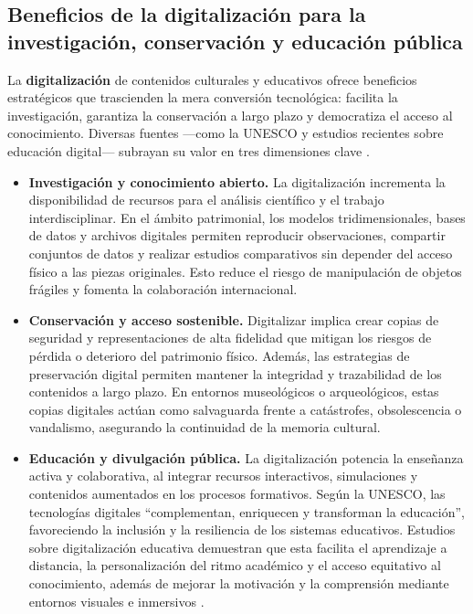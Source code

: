 \subsection*{Beneficios de la digitalización para la investigación, conservación y educación pública}

La \textbf{digitalización} de contenidos culturales y educativos ofrece beneficios estratégicos que trascienden la mera conversión tecnológica: facilita la investigación, garantiza la conservación a largo plazo y democratiza el acceso al conocimiento. Diversas fuentes —como la UNESCO y estudios recientes sobre educación digital— subrayan su valor en tres dimensiones clave \cite{TICPymes2024,UNESCODigitalEducation2025}.

\begin{itemize}
  \item \textbf{Investigación y conocimiento abierto.} La digitalización incrementa la disponibilidad de recursos para el análisis científico y el trabajo interdisciplinar. En el ámbito patrimonial, los modelos tridimensionales, bases de datos y archivos digitales permiten reproducir observaciones, compartir conjuntos de datos y realizar estudios comparativos sin depender del acceso físico a las piezas originales. Esto reduce el riesgo de manipulación de objetos frágiles y fomenta la colaboración internacional.
  
  \item \textbf{Conservación y acceso sostenible.} Digitalizar implica crear copias de seguridad y representaciones de alta fidelidad que mitigan los riesgos de pérdida o deterioro del patrimonio físico. Además, las estrategias de preservación digital permiten mantener la integridad y trazabilidad de los contenidos a largo plazo. En entornos museológicos o arqueológicos, estas copias digitales actúan como salvaguarda frente a catástrofes, obsolescencia o vandalismo, asegurando la continuidad de la memoria cultural.
  
  \item \textbf{Educación y divulgación pública.} La digitalización potencia la enseñanza activa y colaborativa, al integrar recursos interactivos, simulaciones y contenidos aumentados en los procesos formativos. Según la UNESCO, las tecnologías digitales “complementan, enriquecen y transforman la educación”, favoreciendo la inclusión y la resiliencia de los sistemas educativos. Estudios sobre digitalización educativa demuestran que esta facilita el aprendizaje a distancia, la personalización del ritmo académico y el acceso equitativo al conocimiento, además de mejorar la motivación y la comprensión mediante entornos visuales e inmersivos \cite{TICPymes2024,UNESCODigitalEducation2025}.
\end{itemize}

